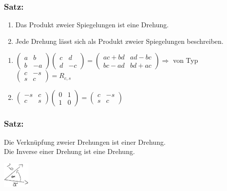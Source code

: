 \subsubsection{Satz:}
\begin{enumerate}
	\item Das Produkt zweier Spiegelungen ist eine Drehung.
	\item Jede Drehung lässt sich als Produkt zweier Spiegelungen beschreiben.
\end{enumerate}
\begin{enumerate}
	\item $ \begin{pmatrix} a & b \\ b & -a \end{pmatrix}  \begin{pmatrix} c & d \\ d & -c \end{pmatrix} = \begin{pmatrix} ac+bd & ad-bc \\ bc-ad & bd+ac \end{pmatrix} \Rightarrow$ von Typ $ \begin{pmatrix} c & -s \\ s & c \end{pmatrix} = R_{c,s}$
	\item $\begin{pmatrix} -s & c \\ c & s \end{pmatrix} \begin{pmatrix} 0 & 1 \\ 1 & 0 \end{pmatrix} = \begin{pmatrix} c  & -s \\ s & c \end{pmatrix}$
\end{enumerate}
%
%
%
\subsubsection{Satz:}
Die Verknüpfung zweier Drehungen ist einer Drehung. \\
Die Inverse einer Drehung ist eine Drehung. 
%

\centering
\includegraphics[width=0.1\textwidth]{mainmatter/chapter1/pics/bewegung2.png}

